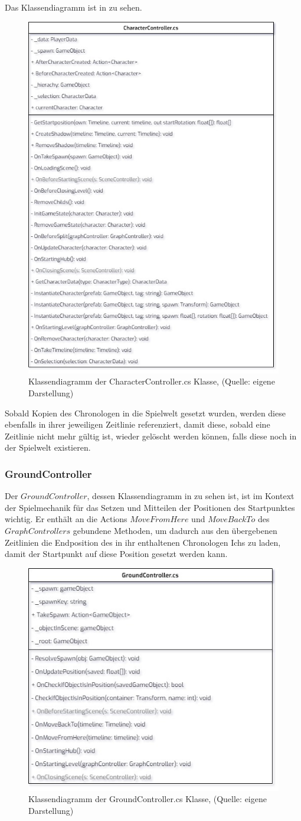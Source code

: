Das Klassendiagramm ist in  zu sehen.

\begin{figure}[ht]
\centering
\includegraphics[width=0.5\linewidth]{content/pictures/CharacterController.jpg}
\caption{Klassendiagramm der CharacterController.cs Klasse, (Quelle: eigene Darstellung)}
\label{fig:characterController-cs}
\end{figure}
\newpage
Sobald Kopien des Chronologen in die Spielwelt gesetzt wurden, werden diese ebenfalls in ihrer jeweiligen Zeitlinie referenziert, damit diese, sobald eine Zeitlinie nicht mehr gültig ist, wieder gelöscht werden können, falls diese noch in der Spielwelt existieren.
\subsubsection{GroundController}
Der $GroundController$, dessen Klassendiagramm in  zu sehen ist, ist im Kontext der Spielmechanik für das Setzen und Mitteilen der Positionen des Startpunktes wichtig. Er enthält an die Actions $MoveFromHere$ und $MoveBackTo$ des $GraphControllers$ gebundene Methoden, um dadurch aus den übergebenen Zeitlinien die Endposition des in ihr enthaltenen Chronologen Ichs zu laden, damit der Startpunkt auf diese Position gesetzt werden kann.

\begin{figure}[ht]
\centering
\includegraphics[width=0.6\linewidth]{content/pictures/GroundController.jpg}
\caption{Klassendiagramm der GroundController.cs Klasse, (Quelle: eigene Darstellung)}
\label{fig:groundCOntroller-cs}
\end{figure}

